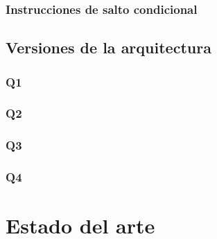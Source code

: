 \subsubsection{Instrucciones de salto condicional}


\subsection{Versiones de la arquitectura}

\subsubsection{Q1}
\subsubsection{Q2}
\subsubsection{Q3}
\subsubsection{Q4}

\section{Estado del arte}

